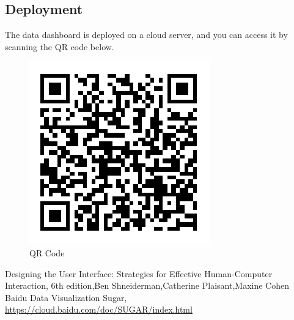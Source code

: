 \documentclass{hci}
\begin{document}
\subsection{Deployment}
The data dashboard is deployed on a cloud server, and you can access it by scanning the QR code below.
\begin{figure}[htbp]
	\centering
	\includegraphics[width=0.3\linewidth]{figures/QR}
	\caption{QR Code}
	\label{fig:QR}
\end{figure}





\begin{thebibliography}{99}
 Designing the User Interface: Strategies for Effective Human-Computer Interaction, 6th edition,Ben Shneiderman,Catherine Plaisant,Maxine Cohen
 Baidu Data Visualization Sugar,  \url{https://cloud.baidu.com/doc/SUGAR/index.html}
\end{thebibliography}
\end{document}
